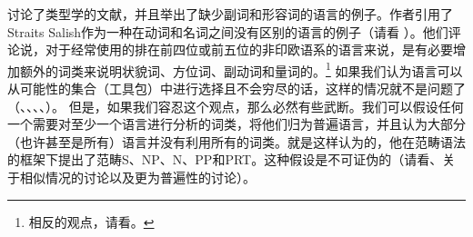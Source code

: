 \citet[Section~2.2.4]{EL2009a}讨论了类型学的文献，并且举出了缺少副词和形容词的语言的例子。作者引用了Straits Salish作为一种在动词和名词之间没有区别的语言的例子（请看 \citealp[]{EL2009b}）。他们评论说，对于经常使用的排在前四位或前五位的非印欧语系的语言来说，是有必要增加额外的词类来说明状貌词、方位词、副动词和量词的。\footnote{
相反的观点，请看。
} 
如果我们认为语言可以从可能性的集合（工具包）中进行选择且不会穷尽的话，这样的情况就不是问题了（\citealp[]{Jackendoff2002a-u}、\citealp[]{Newmeyer2005a}、\citealp*[]{FHC2005a}、\citealp[--7]{Chomsky2007a}、\citealp[, 58, 65]{CR2010a}）。
但是，如果我们容忍这个观点，那么必然有些武断。我们可以假设任何一个需要对至少一个语言进行分析的词类，将他们归为普遍语言，并且认为大部分（也许甚至是所有）语言并没有利用所有的词类。\citet[]{Villavicencio2002a}就是这样认为的，他在范畴语法的框架下提出了范畴S、NP、N、PP和PRT。这种假设是不可证伪的（请看\citealp[]{EL2009a}、\citealp[]{Tomasello2009a}关于相似情况的讨论以及更为普遍性的讨论）。

